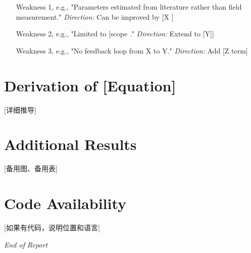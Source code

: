 \documentclass[12pt]{article}
\begin{document}
\begin{enumerate}[leftmargin=*]
    \item [Weakness 1, e.g., "Parameters estimated from literature rather than field measurement."
    \textit{Direction:} Can be improved by [X]]
    \item [Weakness 2, e.g., "Limited to [scope]." \textit{Direction:} Extend to [Y]]
    \item [Weakness 3, e.g., "No feedback loop from X to Y." \textit{Direction:} Add [Z] term]
\end{enumerate}




\appendix
\section{Derivation of [Equation]}
[详细推导]

\section{Additional Results}
[备用图、备用表]

\section{Code Availability}
[如果有代码，说明位置和语言]

\pagebreak
\begin{center}
    \textit{End of Report}
\end{center}
\end{document}
